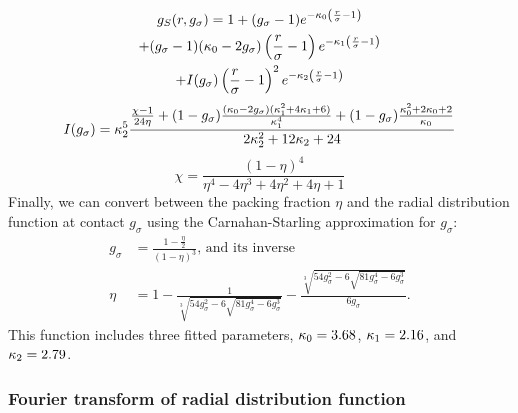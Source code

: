 \documentclass[letterpaper,twocolumn,amsmath,amssymb,pre,aps,10pt]{revtex4-1}
\begin{document}
\begin{multline}\label{eq:gs}
  g_S(r,g_\sigma) = 1 + (g_\sigma-1) e^{-\kappa_0 \left(\frac{r}{\sigma}-1\right)} \\
  + (g_\sigma -1)(\kappa_0 - 2g_\sigma)  \left(\frac{r}{\sigma}-1\right)e^{-\kappa_1  \left(\frac{r}{\sigma}-1\right)} \\
  + I(g_\sigma)  \left(\frac{r}{\sigma}-1\right)^2e^{-\kappa_2  \left(\frac{r}{\sigma}-1\right)}
\end{multline}
\begin{equation}
  I(g_\sigma) = \kappa_2^5 \frac{
    \frac{\chi-1}{24\eta} + (1-g_\sigma) \frac{(\kappa_0-2
      g_\sigma)(\kappa_1^2 + 4 \kappa_1 + 6)}{\kappa_1^4}
    + (1-g_\sigma)\frac{\kappa_0^2 + 2\kappa_0 + 2}{\kappa_0}
  }{2 \kappa_2^2 + 12 \kappa_2 + 24}
\end{equation}
\begin{equation}
  \chi = \frac{(1-\eta)^4}{\eta^4 - 4\eta^3 + 4\eta^2 + 4\eta + 1}
\end{equation}
Finally, we can convert between the packing fraction $\eta$ and the
radial distribution function at contact $g_\sigma$ using the
Carnahan-Starling approximation for $g_\sigma$:
\newcommand\nastyetacuberoot{\sqrt[3]{54 g_\sigma^2 -
    6\sqrt{81g_\sigma^4 - 6g_\sigma^3}}}
\begin{align}
  g_\sigma &= \frac{1-\tfrac{\eta}{2}}{(1-\eta)^3}\text{, and its inverse} \\
  \eta &= 1 - \frac{1}{\nastyetacuberoot} - \frac{\nastyetacuberoot}{6g_\sigma}.
\end{align}
This function includes three fitted parameters, $\kappa_0 =
3.68$, $\kappa_1 = 2.16$,
and $\kappa_2 = 2.79$.

\subsubsection{Fourier transform of radial distribution function}

\newcommand\kapovsig[1]{\frac{\kappa_{#1}}{\sigma}}
\end{document}
